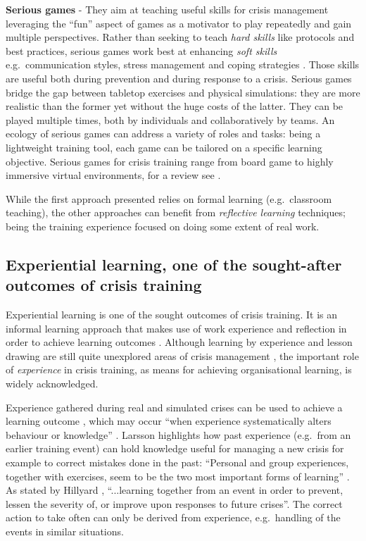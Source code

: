 \textbf{Serious games} - They aim at teaching useful skills for crisis management leveraging the ``fun'' aspect of games as a motivator to play repeatedly and gain multiple perspectives. Rather than seeking to teach \emph{hard skills} like protocols and best practices, serious games work best at enhancing \emph{soft skills} e.g.~communication styles, stress management and coping strategies \autocite{Sagun:2009ks}. Those skills are useful both during prevention and during response to a crisis. Serious games bridge the gap between tabletop exercises and physical simulations: they are more realistic than the former yet without the huge costs of the latter. They can be played multiple times, both by individuals and collaboratively by teams. An ecology of serious games can address a variety of roles and tasks: being a lightweight training tool, each game can be tailored on a specific learning objective. Serious games for crisis training range from board game to highly immersive virtual environments, for a review see \autocite{DiLoreto:2012bj}.

While the first approach presented relies on formal learning (e.g.~classroom teaching), the other approaches can benefit from \emph{reflective learning} \autocite{kolb1984organizational} techniques; being the training experience focused on doing some extent of real work.

\subsection[Experiential learning]{Experiential learning, one of the sought-after outcomes of crisis training}\label{experiential-learning-one-of-the-sought-after-outcomes-of-crisis-training}

Experiential learning is one of the sought outcomes of crisis training. It is an informal learning approach that makes use of work experience and reflection in order to achieve learning outcomes \autocite{kolb1984organizational}. Although learning by experience and lesson drawing are still quite unexplored areas of crisis management \autocites{Lagadec:1997js}{Boin:2007wt}{Stern:1997eb}, the important role of \emph{experience} in crisis training, as means for achieving organisational learning, is widely acknowledged.

Experience gathered during real and simulated crises can be used to achieve a learning outcome \autocite{Deverell:2009fk}, which may occur ``when experience systematically alters behaviour or knowledge'' \autocite[p.233]{Schwab:2007iw}. Larsson \autocite{Larsson:2010jr} highlights how past experience (e.g.~from an earlier training event) can hold knowledge useful for managing a new crisis for example to correct mistakes done in the past: ``Personal and group experiences, together with exercises, seem to be the two most important forms of learning'' \autocite[p.714]{Larsson:2010jr}. As stated by Hillyard \autocite*{Hillyard:SYlJRQLN}, ``...learning together from an event in order to prevent, lessen the severity of, or improve upon responses to future crises''. The correct action to take often can only be derived from experience, e.g.~handling of the events in similar situations.

